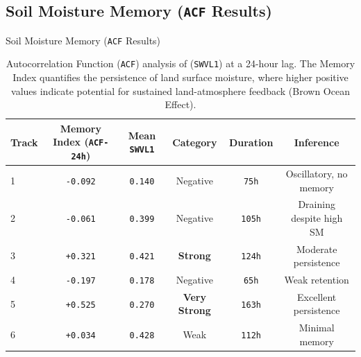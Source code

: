 \documentclass[8pt, aspectratio=169]{beamer}
\begin{document}
\subsection{Soil Moisture Memory (\texttt{ACF} Results)}
\begin{frame}{Soil Moisture Memory (\texttt{ACF} Results)}
    \vspace{-0.5cm}
    \footnotesize
    \begin{center}
        \begin{table}
            \centering
            \caption{\footnotesize Autocorrelation Function (\texttt{ACF}) analysis of (\texttt{SWVL1}) at a 24-hour lag. The Memory Index quantifies the persistence of land surface moisture, where higher positive values indicate potential for sustained land-atmosphere feedback (Brown Ocean Effect).}
            \begin{tabular}{lccccc}
                \toprule
                \textbf{Track} & \textbf{Memory Index (\texttt{ACF-24h})} & \textbf{Mean \texttt{SWVL1}} & \textbf{Category}    & \textbf{Duration} & \textbf{Inference}       \\
                \midrule
                1              & \texttt{-0.092}              & \texttt{0.140}               & Negative             & \texttt{75h}               & Oscillatory, no memory   \\
                2              & \texttt{-0.061}              & \texttt{0.399}               & Negative             & \texttt{105h}              & Draining despite high SM \\
                3              & \texttt{+0.321}              & \texttt{0.421}               & \textbf{Strong}      & \texttt{124h}              & Moderate persistence     \\
                4              & \texttt{-0.197}              & \texttt{0.178}               & Negative             & \texttt{65h}               & Weak retention           \\
                5              & \texttt{+0.525}              & \texttt{0.270}               & \textbf{Very Strong} & \texttt{163h}              & Excellent persistence    \\
                6              & \texttt{+0.034}              & \texttt{0.428}               & Weak                 & \texttt{112h}              & Minimal memory           \\
                \bottomrule
            \end{tabular}
        \end{table}
    \end{center}


\end{frame}
\end{document}
